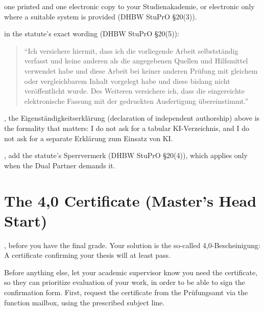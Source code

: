 \documentclass{../sharedAssets/tufte}
\begin{document}
 one printed and one electronic copy to your Studienakademie, or
electronic only where a suitable system is provided (DHBW StuPrO \S20(3)).

 in the statute's
exact wording (DHBW StuPrO \S20(5)):
\begin{quote}
``Ich versichere hiermit, dass ich die vorliegende Arbeit selbstst\"andig verfasst und
keine anderen als die angegebenen Quellen und Hilfsmittel verwendet habe und diese Arbeit
bei keiner anderen Pr\"ufung mit gleichem oder vergleichbarem Inhalt vorgelegt habe und
diese bislang nicht ver\"offentlicht wurde.
Des Weiteren versichere ich, dass die eingereichte elektronische Fassung mit der
gedruckten Ausfertigung \"ubereinstimmt.''
\end{quote}

, the Eigenst\"andigkeitserkl\"arung (declaration of
independent authorship) above is the formality that matters: I do not ask for a tabular
KI-Verzeichnis, and I do not ask for a separate Erkl\"arung zum Einsatz von KI.

, add the statute's Sperrvermerk
(DHBW StuPrO \S20(4)), which applies only when the Dual Partner demands it.

\section{The 4,0 Certificate (Master's Head Start)}
, before you have the final grade.
Your solution is the so-called 4,0-Bescheinigung: A certificate confirming your thesis will
at least pass.

Before anything else, let your academic supervisor know you need the certificate, so they can prioritize evaluation of your work, in order to be able
to sign the confirmation form.
First, request the certificate from the Prüfungsamt via the function mailbox, using the
prescribed subject line.

\end{document}
